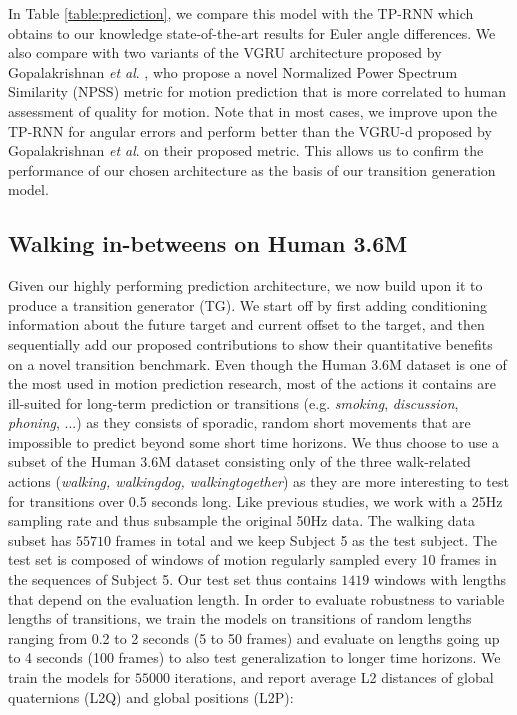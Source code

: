\documentclass[acmtog]{acmart}
\newcommand{\etal}{\textit{et al}. }
\begin{document}
In Table \ref{table:prediction}, we compare this model with the TP-RNN which obtains to our knowledge state-of-the-art results for Euler angle differences. We also compare with two variants of the VGRU architecture proposed by Gopalakrishnan \etal {}, who propose a novel Normalized Power Spectrum Similarity (NPSS) metric for motion prediction that is more correlated to human assessment of quality for motion. Note that in most cases, we improve upon the TP-RNN for angular errors and perform better than the VGRU-d proposed by Gopalakrishnan \etal {} on their proposed metric. This allows us to confirm the performance of our chosen architecture as the basis of our transition generation model.  \subsection{Walking in-betweens on Human 3.6M}\label{sec:human_transition}
Given our highly performing prediction architecture, we now build upon it to produce a transition generator (TG). We start off by first adding conditioning information about the future target and current offset to the target, and then sequentially add our proposed contributions to show their quantitative benefits on a novel transition benchmark. Even though the Human 3.6M dataset is one of the most used in motion prediction research, most of the actions it contains are ill-suited for long-term prediction or transitions (e.g. \textit{smoking}, \textit{discussion}, \textit{phoning}, ...) as they consists of sporadic, random short movements that are impossible to predict beyond some short time horizons. We thus choose to use a subset of the Human 3.6M dataset consisting only of the three walk-related actions (\textit{walking, walkingdog, walkingtogether}) as they are more interesting to test for transitions over 0.5 seconds long. Like previous studies, we work with a 25Hz sampling rate and thus subsample the original 50Hz data. The walking data subset has $\num{55710}$ frames in total and we keep Subject 5 as the test subject. The test set is composed of windows of motion regularly sampled every 10 frames in the sequences of Subject 5. Our test set thus contains $\num{1419}$ windows with lengths that depend on the evaluation length. In order to evaluate robustness to variable lengths of transitions, we train the models on transitions of random lengths ranging from 0.2 to 2 seconds (5 to 50 frames) and evaluate on lengths going up to 4 seconds (100 frames) to also test generalization to longer time horizons. We train the models for $\num{55000}$ iterations, and report average L2 distances of global quaternions (L2Q) and global positions (L2P):
\end{document}
